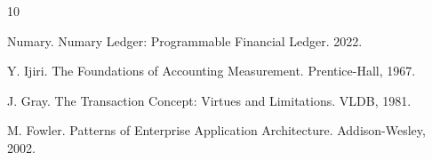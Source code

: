 \documentclass[11pt,twocolumn]{article}
\begin{document}

\begin{thebibliography}{10}

Numary. Numary Ledger: Programmable Financial Ledger. 2022.

Y. Ijiri. The Foundations of Accounting Measurement. Prentice-Hall, 1967.

J. Gray. The Transaction Concept: Virtues and Limitations. VLDB, 1981.

M. Fowler. Patterns of Enterprise Application Architecture. Addison-Wesley, 2002.

\end{thebibliography}
\end{document}

